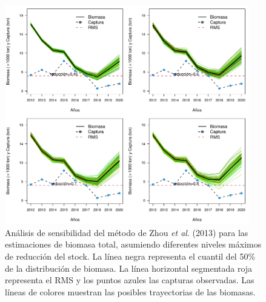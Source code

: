 \documentclass[
  spanish,
]{article}
\begin{document}
\vspace{0.5cm}

\begin{figure}[h!]
\centering
\includegraphics[width=0.95\textwidth]{Figuras/Fig2_Zhou2013_depletion-1.pdf}
\caption{Análisis de sensibilidad del método de Zhou \textit{et al}. (2013) para las estimaciones de biomasa total, asumiendo diferentes niveles máximos de reducción del stock. La línea negra representa el cuantil del 50\% de la distribución de biomasa. La línea horizontal segmentada roja representa el RMS y los puntos azules las capturas observadas. Las líneas de colores muestran las posibles trayectorias de las biomasas.}
\label{Fig12}
\end{figure}

\pagebreak
\end{document}
